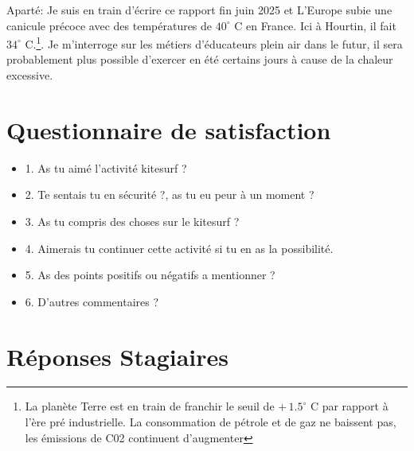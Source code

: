 \documentclass[11pt,a4paper]{report}
\begin{document}
Aparté: Je suis en train d'écrire ce rapport fin juin 2025 et L’Europe subie
une canicule précoce avec des températures de $40^{\circ}$ C en France. Ici à Hourtin, 
il fait $34^{\circ}$ C.\footnote{
La planète Terre est en train de franchir le seuil  de  $+\, 1.5^{\circ}$ C par rapport
 à l'ère pré industrielle. La consommation de pétrole et de gaz ne baissent pas, les 
émissions de C02 continuent d'augmenter\cite{giec}}.
Je m'interroge sur les métiers d'éducateurs plein air dans le futur, il sera
probablement plus possible d'exercer en été certains jours
à cause de la chaleur excessive.

\appendix
\appendixpage
\addappheadtotoc
\chapter{Questionnaire de satisfaction\label{questionnaire}}
\begin{itemize}
\item 1. As tu aimé l'activité kitesurf ?
\item 2. Te sentais tu en sécurité ?, as tu eu peur à un moment ?
\item 3. As tu compris des choses sur le kitesurf ?
\item 4. Aimerais tu continuer cette activité si tu en as la possibilité.
\item 5. As des points positifs ou négatifs a mentionner ?
\item 6. D'autres commentaires ?
\end{itemize}

\chapter{Réponses Stagiaires\label{reponses}}
\end{document}
